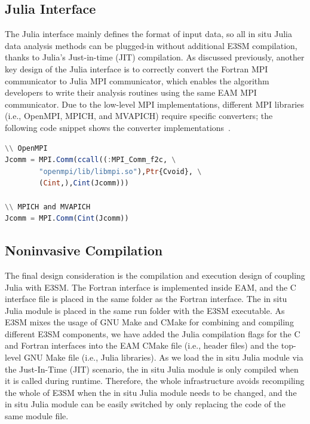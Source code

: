 \documentclass{juliacon}
\begin{document}
\subsection{Julia Interface}

The Julia interface mainly defines the format of input data, so all in situ Julia data analysis methods can be plugged-in without additional E3SM compilation, thanks to Julia's Just-in-time (JIT) compilation.
As discussed previously, another key design of the Julia interface is to correctly convert the Fortran MPI communicator to Julia MPI communicator, which enables the algorithm developers to write their analysis routines using the same EAM MPI communicator. Due to the low-level MPI implementations, different MPI libraries (i.e., OpenMPI, MPICH, and MVAPICH) require specific converters; the following code snippet shows the converter implementations~\cite{gabriel2004open,panda2013mvapich,gropp1996user}.

\begin{minipage}{\linewidth}
\begin{lstlisting}[language = Julia, caption={Juila interface MPI conversion.}]
\\ OpenMPI
Jcomm = MPI.Comm(ccall((:MPI_Comm_f2c, \
        "openmpi/lib/libmpi.so"),Ptr{Cvoid}, \
        (Cint,),Cint(Jcomm)))

\\ MPICH and MVAPICH
Jcomm = MPI.Comm(Cint(Jcomm))
\end{lstlisting}
\end{minipage}


\subsection{Noninvasive Compilation}
The final design consideration is the compilation and execution design of coupling Julia with E3SM. The Fortran interface is implemented inside EAM, and the C interface file is placed in the same folder as the Fortran interface. The in situ Julia module is placed in the same run folder with the E3SM executable. As E3SM mixes the usage of GNU Make and CMake for combining and compiling different E3SM components, we have added the Julia compilation flags for the C and Fortran interfaces into the EAM CMake file (i.e., header files) and the top-level GNU Make file (i.e., Julia libraries). As we load the in situ Julia module via the Just-In-Time (JIT) scenario, the in situ Julia module is only compiled when it is called during runtime. Therefore, the whole infrastructure avoids recompiling the whole of E3SM when the in situ Julia module needs to be changed, and the in situ Julia module can be easily switched by only replacing the code of the same module file.
\end{document}
